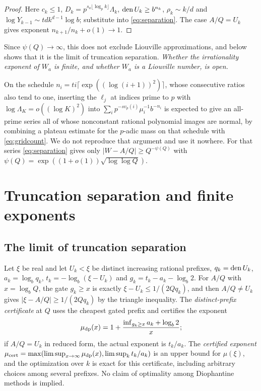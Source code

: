 \documentclass[11pt]{article}
\begin{document}
\begin{proof}
Here $c_k\le1$, $D_k=p^{s_a\lfloor\log_pk\rfloor}\Lambda_k$, $\operatorname{den} U_k\ge b^{n_k}$, $\rho_k\sim k/d$ and $\log Y_{k-1}\sim tdk^{d-1}\log b$; substitute
into \eqref{eq:separation}. The case $A/Q=U_k$ gives exponent $n_{k+1}/n_k+o(1)\to1$.
\end{proof}

Since $\psi(Q)\to\infty$, this does not exclude Liouville approximations, and  below shows that it is
the limit of truncation separation. \emph{Whether the irrationality exponent of $W_a$ is finite, and whether $W_a$ is a
Liouville number, is open.}

\begin{remark}\label{rem:quasipoly}
On the schedule $n_i=ti\lceil\exp((\log(i+1))^2)\rceil$, whose consecutive ratios also tend to one, inserting the $\ell_j$ at
indices prime to $p$ with $\log\Lambda_K=o((\log K)^2)$ into $\sum_ip^{-sv_p(i)}\mu_i^{-1}b^{-n_i}$ is expected to give an all-prime
series all of whose nonconstant rational polynomial images are normal, by combining a plateau estimate for the $p$-adic
mass on that schedule with \eqref{eq:gridcount}. We do not reproduce that argument and use it nowhere. For that series
\eqref{eq:separation} gives only $|W-A/Q|\ge Q^{-\psi(Q)}$ with $\psi(Q)=\exp((1+o(1))\sqrt{\log\log Q})$.
\end{remark}

\section{Truncation separation and finite exponents}\label{sec:finite}

\subsection{The limit of truncation separation}

Let $\xi$ be real and let $U_k<\xi$ be distinct increasing rational prefixes, $q_k=\operatorname{den} U_k$, $a_k=\log_bq_k$,
$t_k=-\log_b(\xi-U_k)$ and $g_k=t_k-a_k-\log_b2$. For $A/Q$ with $x=\log_bQ$, the gate $g_k\ge x$ is exactly
$\xi-U_k\le1/(2Qq_k)$, and then $A/Q\ne U_k$ gives $|\xi-A/Q|\ge1/(2Qq_k)$ by the triangle inequality. The \emph{distinct-prefix
certificate} at $Q$ uses the cheapest gated prefix and certifies the exponent
\[
\mu_{\rm dp}(x)=1+\frac{\inf_{g_k\ge x}a_k+\log_b2}{x};
\]
if $A/Q=U_k$ in reduced form, the actual exponent is $t_k/a_k$. The \emph{certified exponent}
$\mu_{\rm cert}=\max(\limsup_{x\to\infty}\mu_{\rm dp}(x),\limsup_kt_k/a_k)$ is an upper bound for $\mu(\xi)$, and the optimization over
$k$ is exact for this certificate, including arbitrary choices among several prefixes. No claim of optimality among
Diophantine methods is implied.
\end{document}
